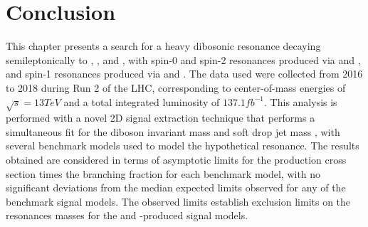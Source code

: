 
\section{Conclusion}
\label{sec:conclusion}

This chapter presents a search for a heavy dibosonic resonance decaying semileptonically to \WW, \WZ, and \WH, with spin-0 and spin-2 resonances produced via \ggF and \VBF, and spin-1 resonances produced via \DY and \VBF.
The data used were collected from 2016 to 2018 during Run 2 of the LHC, corresponding to center-of-mass energies of $\sqrt{s}=13\unit{TeV}$ and a total integrated luminosity of $137.1\unit{fb^{-1}}$.
This analysis is performed with a novel 2D signal extraction technique that performs a simultaneous fit for the diboson invariant mass \MVV and soft drop jet mass \MJ, with several benchmark models used to model the hypothetical resonance.
The results obtained are considered in terms of asymptotic limits for the production cross section times the branching fraction for each benchmark model, with no significant deviations from the median expected limits observed for any of the benchmark signal models.
The observed limits establish exclusion limits on the resonances masses for the \DY and \ggF-produced signal models.
